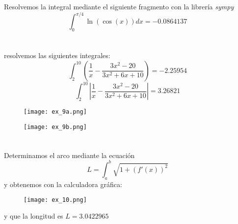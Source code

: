 \documentclass[12pt,a4paper,oneside,onecolumn]{article}
\begin{document}
	\section{}
	Resolvemos la integral mediante el siguiente fragmento con la librer\'ia \textit{sympy}
	\[
		\int_{0}^{\pi/4}{\ln{(\cos{(x)})}dx} = -0.0864137
	\]
	
	
	\section{}
	resolvemos las siguientes integrales:
	\[
	\int_{2}^{10}{(\frac{1}{x} - \frac{3x^2 - 20}{3x^2 + 6x + 10})} = -2.25954
	\]
	\[
	\int_{2}^{10}{|\frac{1}{x} - \frac{3x^2 - 20}{3x^2 + 6x + 10}|} = 3.26821
	\]
	\begin{figure}[!h]
		\centering
		\texttt{[image: ex\_9a.png]}
		\caption{}
		\label{fig:08}
	\end{figure}
	\begin{figure}[!h]
		\centering
		\texttt{[image: ex\_9b.png]}
		\caption{}
		\label{fig:09}
	\end{figure}

	\section{}
	Determinamos el arco mediante la ecuaci\'on 
	\[
		L = \int_{a}^{b}\sqrt{1 + (f'(x))^2}
	\]
	y obtenemos con la calculadora gr\'afica:
	\begin{figure}[!h]
		\centering
		\texttt{[image: ex\_10.png]}
		\caption{}
		\label{fig:10}
	\end{figure}
	\newline \newline 
	y que la longitud es \(L = 3.0422965\)
\end{document}
